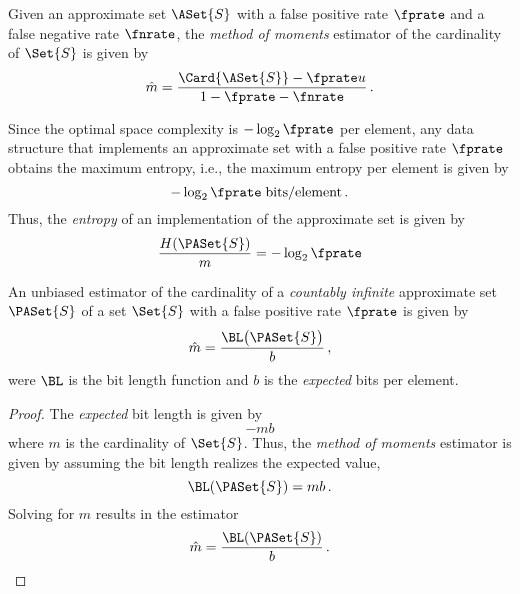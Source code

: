 \documentclass[ ../main.tex]{subfiles}
\begin{document}
Given an approximate set $\ASet{S}$ with a false positive rate $\fprate$ and a false negative rate $\fnrate$, the \emph{method of moments} estimator of the cardinality of $\Set{S}$ is given by
\begin{equation}
\label{eq:exp_St_finite}
    \hat{m} = \frac{\Card{\ASet{S}} - \fprate u}{1 - \fprate - \fnrate}\,.
\end{equation}


Since the optimal space complexity is $-\log_2 \fprate$ per element, any data structure that implements an approximate set with a false positive rate $\fprate$ obtains the maximum entropy, i.e., the maximum entropy per element is given by
\begin{equation}
    -\log_2 \fprate \; \si{bits \per element}\,.
\end{equation}
Thus, the \emph{entropy} of an implementation of the approximate set is given by
\begin{equation}
    \frac{H(\PASet{S})}{m} = -\log_2 \fprate
\end{equation}




\begin{theorem}
An unbiased estimator of the cardinality of a \emph{countably infinite} approximate set $\PASet{S}$ of a set $\Set{S}$ with a false positive rate $\fprate$ is given by
\begin{equation}
    \hat{m} = \frac{\BL\!\left(\PASet{S}\right)}{b}\,,
\end{equation}
were $\BL$ is the bit length function and $b$ is the \emph{expected} bits per element.
\end{theorem}
\begin{proof}
The \emph{expected} bit length is given by
\begin{equation*}
    -m b
\end{equation*}
where $m$ is the cardinality of $\Set{S}$. Thus, the \emph{method of moments} estimator is given by assuming the bit length realizes the expected value,
\begin{equation}
    \BL(\PASet{S}) = m b\,.
\end{equation}
Solving for $m$ results in the estimator
\begin{equation}
    \hat{m} = \frac{\BL(\PASet{S})}{b}\,.
\end{equation}
\end{proof}
\end{document}
